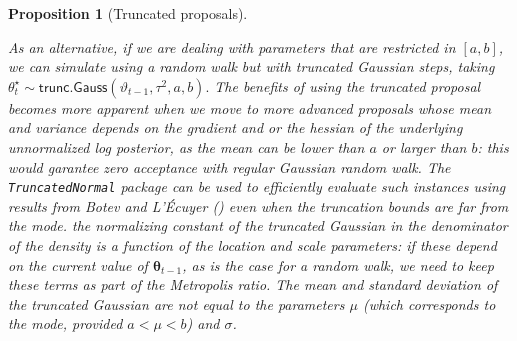 \documentclass[
  11pt,
  letterpaper,
]{scrbook}
\theoremstyle{definition}
\theoremstyle{plain}
\newtheorem{proposition}{Proposition}[chapter]
\theoremstyle{plain}
\theoremstyle{definition}
\theoremstyle{definition}
\theoremstyle{remark}
\begin{document}
\begin{proposition}[Truncated
proposals]\protect\hypertarget{prp-truncated-proposals}{}\label{prp-truncated-proposals}

As an alternative, if we are dealing with parameters that are restricted
in \([a,b]\), we can simulate using a random walk but with truncated
Gaussian steps, taking
\(\theta^{\star}_{t} \sim \mathsf{trunc. Gauss}(\vartheta_{t-1}, \tau^2, a, b).\)
The benefits of using the truncated proposal becomes more apparent when
we move to more advanced proposals whose mean and variance depends on
the gradient and or the hessian of the underlying unnormalized log
posterior, as the mean can be lower than \(a\) or larger than \(b\):
this would garantee zero acceptance with regular Gaussian random walk.
The \texttt{TruncatedNormal} package can be used to efficiently evaluate
such instances using results from Botev and L'Écuyer
() even when the truncation
bounds are far from the mode. the normalizing constant of the truncated
Gaussian in the denominator of the density is a function of the location
and scale parameters: if these depend on the current value of
\(\boldsymbol{\theta}_{t-1}\), as is the case for a random walk, we need
to keep these terms as part of the Metropolis ratio. The mean and
standard deviation of the truncated Gaussian are not equal to the
parameters \(\mu\) (which corresponds to the mode, provided
\(a < \mu < b\)) and \(\sigma\).

\end{proposition}
\end{document}
